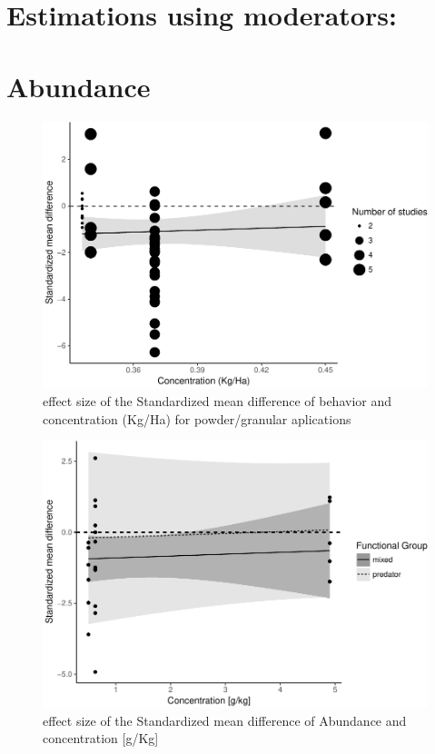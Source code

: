 \documentclass[]{elsarticle} %
\makeatletter
\def\maxwidth{\ifdim\Gin@nat@width>\linewidth\linewidth
\else\Gin@nat@width\fi}
\let\Oldincludegraphics\includegraphics
\renewcommand{\includegraphics}[1]{\Oldincludegraphics[width=\maxwidth]{#1}}
\makeatother
\begin{document}
\section{Estimations using
moderators:}\label{estimations-using-moderators}

\section{Abundance}\label{abundance}

\begin{figure}[htbp]
\centering
\includegraphics{MetanalysisNeonics2_files/figure-latex/unnamed-chunk-8-1.pdf}
\caption{effect size of the Standardized mean difference of behavior and
concentration (Kg/Ha) for powder/granular aplications}
\end{figure}

\begin{figure}[htbp]
\centering
\includegraphics{MetanalysisNeonics2_files/figure-latex/unnamed-chunk-11-1.pdf}
\caption{effect size of the Standardized mean difference of Abundance
and concentration {[}g/Kg{]}}
\end{figure}
\end{document}
